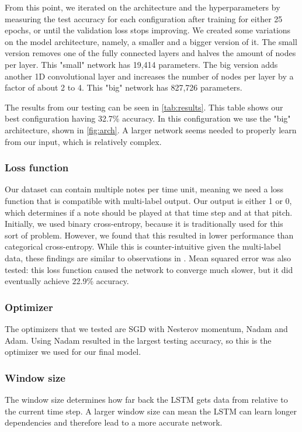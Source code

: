 \documentclass[11pt, twocolumn]{article}
\begin{document}
From this point, we iterated on the architecture and the hyperparameters by measuring the test accuracy for each configuration after training for either 25 epochs, or until the validation loss stops improving. We created some variations on the model architecture, namely, a smaller and a bigger version of it. The small version removes one of the fully connected layers and halves the amount of nodes per layer. This "small" network has 19,414 parameters. The big version adds another 1D convolutional layer and increases the number of nodes per layer by a factor of about 2 to 4. This "big" network has 827,726 parameters.

The results from our testing can be seen in \autoref{tab:results}. This table shows our best configuration having 32.7\% accuracy. In this configuration we use the "big" architecture, shown in \autoref{fig:arch}. A larger network seems needed to properly learn from our input, which is relatively complex. 

\subsubsection{Loss function}
Our dataset can contain multiple notes per time unit, meaning we need a loss function that is compatible with multi-label output. Our output is either 1 or 0, which determines if a note should be played at that time step and at that pitch.
Initially, we used binary cross-entropy, because it is traditionally used for this sort of problem. However, we found that this resulted in lower performance than categorical cross-entropy. While this is counter-intuitive given the multi-label data, these findings are similar to observations in \cite{Mahajan_2018_ECCV}. Mean squared error was also tested: this loss function caused the network to converge much slower, but it did eventually achieve 22.9\% accuracy.

\subsubsection{Optimizer}
The optimizers that we tested are SGD with Nesterov momentum, Nadam and Adam. Using Nadam resulted in the largest testing accuracy, so this is the optimizer we used for our final model.

\subsubsection{Window size}
The window size determines how far back the LSTM gets data from relative to the current time step. A larger window size can mean the LSTM can learn longer dependencies and therefore lead to a more accurate network.
\end{document}
